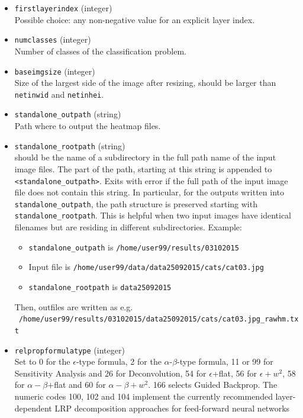 \documentclass[a4wide]{article}
\begin{document}
\begin{itemize}
 \item \texttt{firstlayerindex} (integer) \\
Possible choice: any non-negative value for an explicit layer index.

\item \texttt{numclasses} (integer) \\
Number of classes of the classification problem.

\item \texttt{baseimgsize} (integer)  \\
Size of the largest side of the image after resizing, should be larger than \texttt{netinwid} and \texttt{netinhei}.

\item \texttt{standalone\_outpath} (string) \\
Path where to output the heatmap files.

\item \texttt{standalone\_rootpath}  (string) \\
should be the name of a subdirectory in the full path name of the input image files. The part of the path, starting at this string is appended to \texttt{<standalone\_outpath>}. Exits with error if the full path of the input image file does not contain this string. In particular, for the outputs written into \texttt{standalone\_outpath}, the path structure is preserved starting with \texttt{standalone\_rootpath}. This is helpful when two input images have identical filenames but are residing in different subdirectories. Example:
\begin{itemize}
\item \texttt{standalone\_outpath} is \texttt{/home/user99/results/03102015}
\item Input file is \texttt{/home/user99/data/data25092015/cats/cat03.jpg}
\item \texttt{standalone\_rootpath} is \texttt{data25092015}
\end{itemize}
Then, outfiles are written as e.g. \texttt{~/home/user99/results/03102015/data25092015/cats/cat03.jpg\_rawhm.txt}


\item \texttt{relpropformulatype} (integer) \\
Set to 0 for the $\epsilon$-type formula,
2 for the $\alpha$-$\beta$-type formula,
11 or 99 for Sensitivity Analysis and 26 for Deconvolution,
54 for $\epsilon$+flat,
56  for $\epsilon+w^2$,
58 for $\alpha-\beta$+flat
and 60 for $\alpha-\beta+w^2$.
166 selects Guided Backprop.
The numeric codes 100, 102 and 104 implement the currently recommended layer-dependent LRP decomposition approaches for feed-forward neural networks~\cite{kohlbrenner2019towards,samek2020toward}


\end{itemize}
\end{document}

